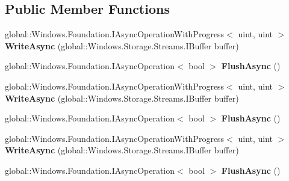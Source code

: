 \subsection*{Public Member Functions}
\begin{DoxyCompactItemize}
\item 
\mbox{\label{interface_windows_1_1_storage_1_1_streams_1_1_i_output_stream_a3c33abbd8925cdb3fd9fb7ae1076bc92}} 
global\+::\+Windows.\+Foundation.\+I\+Async\+Operation\+With\+Progress$<$ uint, uint $>$ {\bfseries Write\+Async} (global\+::\+Windows.\+Storage.\+Streams.\+I\+Buffer buffer)
\item 
\mbox{\label{interface_windows_1_1_storage_1_1_streams_1_1_i_output_stream_a8c8807c37d91cc2417a24d0fc5b06cb1}} 
global\+::\+Windows.\+Foundation.\+I\+Async\+Operation$<$ bool $>$ {\bfseries Flush\+Async} ()
\item 
\mbox{\label{interface_windows_1_1_storage_1_1_streams_1_1_i_output_stream_a3c33abbd8925cdb3fd9fb7ae1076bc92}} 
global\+::\+Windows.\+Foundation.\+I\+Async\+Operation\+With\+Progress$<$ uint, uint $>$ {\bfseries Write\+Async} (global\+::\+Windows.\+Storage.\+Streams.\+I\+Buffer buffer)
\item 
\mbox{\label{interface_windows_1_1_storage_1_1_streams_1_1_i_output_stream_a8c8807c37d91cc2417a24d0fc5b06cb1}} 
global\+::\+Windows.\+Foundation.\+I\+Async\+Operation$<$ bool $>$ {\bfseries Flush\+Async} ()
\item 
\mbox{\label{interface_windows_1_1_storage_1_1_streams_1_1_i_output_stream_a3c33abbd8925cdb3fd9fb7ae1076bc92}} 
global\+::\+Windows.\+Foundation.\+I\+Async\+Operation\+With\+Progress$<$ uint, uint $>$ {\bfseries Write\+Async} (global\+::\+Windows.\+Storage.\+Streams.\+I\+Buffer buffer)
\item 
\mbox{\label{interface_windows_1_1_storage_1_1_streams_1_1_i_output_stream_a8c8807c37d91cc2417a24d0fc5b06cb1}} 
global\+::\+Windows.\+Foundation.\+I\+Async\+Operation$<$ bool $>$ {\bfseries Flush\+Async} ()

\end{DoxyCompactItemize}
